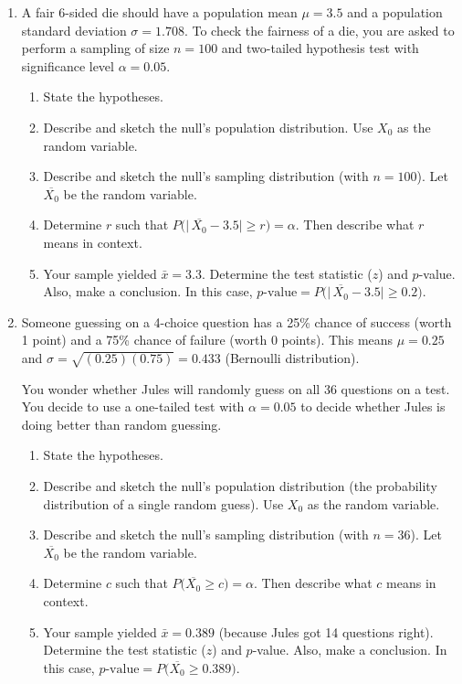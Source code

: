 \documentclass[12pt,letterpaper]{article}
\begin{document}
\begin{enumerate}

\item A fair 6-sided die should have a population mean $\mu=3.5$ and a population standard deviation $\sigma=1.708$. To check the fairness of a die, you are asked to perform a sampling of size $n=100$ and two-tailed hypothesis test with significance level $\alpha = 0.05$. 
\begin{enumerate}
\item State the hypotheses.
\vfill
\item Describe and sketch the null's population distribution. Use $X_0$ as the random variable.
\vfill
\item Describe and sketch the null's sampling distribution (with $n=100$). Let $\overline{X_0}$ be the random variable.
\vfill
\item Determine $r$ such that $P\Big(\big|\,\overline{X_0}-3.5\big| \ge r \Big) = \alpha$. Then describe what $r$ means in context.
\vfill
\item Your sample yielded $\bar{x} = 3.3$. Determine the test statistic ($z$) and $p$-value. Also, make a conclusion. In this case, $p\text{-value} = P\Big(\big|\,\overline{X_0}-3.5\big| \ge 0.2 \Big) $.
\vfill
\end{enumerate}

\newpage


\item Someone guessing on a 4-choice question has a 25\% chance of success (worth 1 point) and a 75\% chance of failure (worth 0 points). This means $\mu = 0.25$ and $\sigma = \sqrt{(0.25)(0.75)} = 0.433$ (Bernoulli distribution). 

You wonder whether Jules will randomly guess on all 36 questions on a test. You decide to use a one-tailed test with $\alpha=0.05$ to decide whether Jules is doing better than random guessing.

\begin{enumerate}
\item State the hypotheses.
\vfill
\item Describe and sketch the null's population distribution (the probability distribution of a single random guess). Use $X_0$ as the random variable.
\vfill
\item Describe and sketch the null's sampling distribution (with $n=36$). Let $\overline{X_0}$ be the random variable.
\vfill
\item Determine $c$ such that $P\Big(\overline{X_0} \ge c \Big) = \alpha$. Then describe what $c$ means in context.
\vfill
\item Your sample yielded $\bar{x} = 0.389$ (because Jules got 14 questions right). Determine the test statistic ($z$) and $p$-value. Also, make a conclusion. In this case, $p\text{-value} = P\Big( \overline{X_0} \ge 0.389 \Big) $.
\vfill
\end{enumerate}


\end{enumerate}
\end{document}
